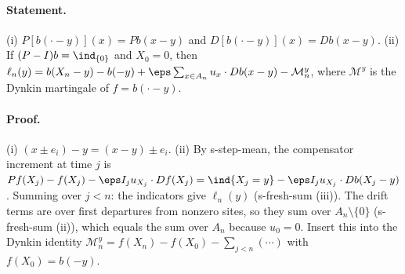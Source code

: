 \paragraph{Statement.} (i) $P[b(\cdot-y)](x)=Pb(x-y)$ and $D[b(\cdot-y)](x)=Db(x-y)$. (ii) If $(P-I)b=\ind_{\{0\}}$ and
$X_0=0$, then $\ell_n(y)=b(X_n-y)-b(-y)+\eps\sum_{x\in A_n}u_x\cdot Db(x-y)-\mathcal M^y_n$, where $\mathcal M^y$ is the
Dynkin martingale of $f=b(\cdot-y)$.
\paragraph{Proof.} (i) $(x\pm e_i)-y=(x-y)\pm e_i$. (ii) By s-step-mean, the compensator increment at time $j$ is
$Pf(X_j)-f(X_j)-\eps I_ju_{X_j}\cdot Df(X_j)=\ind\{X_j=y\}-\eps I_ju_{X_j}\cdot Db(X_j-y)$. Summing over $j<n$:
the indicators give $\ell_n(y)$ (s-fresh-sum (iii)). The drift terms are over first departures from nonzero
sites, so they sum over $A_n\setminus\{0\}$ (s-fresh-sum (ii)), which equals the sum over $A_n$ because
$u_0=0$. Insert this into the Dynkin identity $\mathcal M^y_n=f(X_n)-f(X_0)-\sum_{j<n}(\cdots)$ with
$f(X_0)=b(-y)$.
